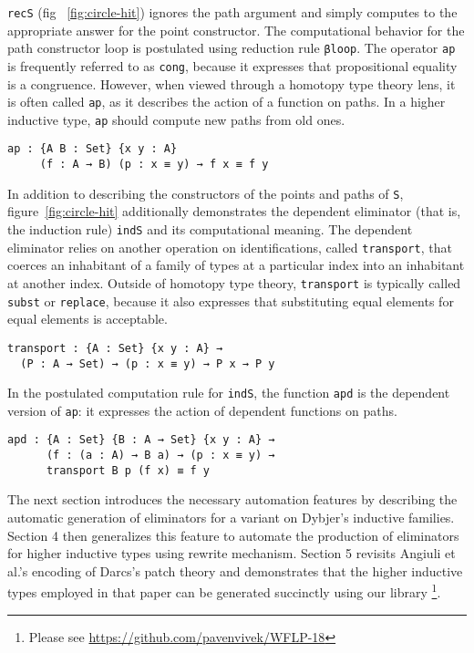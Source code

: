 \documentclass[runningheads]{llncs}
\begin{document}
{\tt recS} (fig ~\ref{fig:circle-hit}) ignores the path argument and simply computes to the appropriate answer for the point constructor. The computational behavior for the path constructor loop is postulated using reduction rule {\tt βloop}.
The operator \texttt{ap} is frequently referred to as \texttt{cong}, because it expresses that propositional equality is a congruence.
However, when viewed through a homotopy type theory lens, it is often called \texttt{ap}, as it describes the action of a function on paths.
In a higher inductive type, \texttt{ap} should compute new paths from old ones.
\begin{center}
\fontsize{7.9pt}{0pt}\selectfont
\begin{BVerbatim}
ap : {A B : Set} {x y : A}
     (f : A → B) (p : x ≡ y) → f x ≡ f y
\end{BVerbatim}
\end{center}

In addition to describing the constructors of the points and paths of \texttt{S}, figure~\ref{fig:circle-hit} additionally demonstrates the dependent eliminator (that is, the induction rule) {\tt indS} and its computational meaning.
The dependent eliminator relies on another operation on identifications, called \texttt{transport}, that coerces an inhabitant of a family of types at a particular index into an inhabitant at another index.
Outside of homotopy type theory, \texttt{transport} is typically called \texttt{subst} or \texttt{replace}, because it also expresses that substituting equal elements for equal elements is acceptable.
\begin{center}
\fontsize{7.9pt}{0pt}\selectfont
\begin{BVerbatim}
transport : {A : Set} {x y : A} → 
  (P : A → Set) → (p : x ≡ y) → P x → P y
\end{BVerbatim}
\end{center}

In the postulated computation rule for \texttt{indS}, the function {\tt apd} is the dependent version of \texttt{ap}: it expresses the action of dependent functions on paths.
\begin{center}
\fontsize{7.9pt}{0pt}\selectfont
\begin{BVerbatim}
apd : {A : Set} {B : A → Set} {x y : A} → 
      (f : (a : A) → B a) → (p : x ≡ y) →
      transport B p (f x) ≡ f y
\end{BVerbatim}
\end{center}

The next section introduces the necessary automation features by describing the automatic generation of eliminators for a variant on Dybjer's inductive families. Section 4 then generalizes this feature to automate the production of eliminators for higher inductive types using rewrite mechanism. Section 5 revisits Angiuli et al.'s encoding of Darcs's patch theory \cite{Angiuli-2014} and demonstrates that the higher inductive types employed in that paper can be generated succinctly using our library \footnote{Please see \url{https://github.com/pavenvivek/WFLP-18}}.
\end{document}
